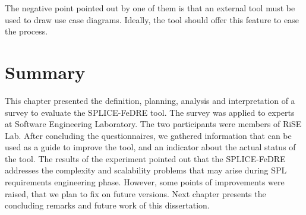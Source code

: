The negative point pointed out by one of them is that an external tool must be used to draw use case diagrams. 
Ideally, the tool should offer this feature to ease the process.
\section{Summary}
\label{sc:expsummary}

This chapter presented the definition, planning, analysis and interpretation of a survey 
to evaluate the SPLICE-FeDRE tool. The survey was applied to experts at Software Engineering Laboratory. 
The two participants were members of \ac{RiSE} Lab. After concluding the  
questionnaires, we gathered information that can be used as a guide to improve the tool, and an indicator 
about the actual status of the tool. 
The results of the experiment pointed out that the SPLICE-FeDRE addresses the 
complexity and scalability problems that may arise during \ac{SPL} requirements
engineering phase.
However, some points of improvements were raised, that we plan to fix on future versions. Next 
chapter presents the concluding remarks and future work of this dissertation.



